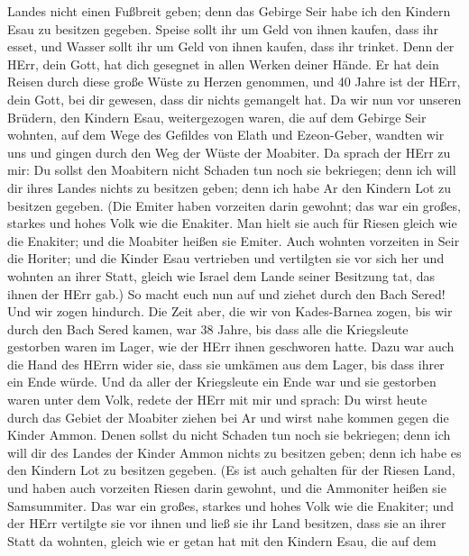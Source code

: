 Landes nicht einen Fußbreit geben; denn das Gebirge Seir habe ich den
Kindern Esau zu besitzen gegeben.  Speise sollt ihr um Geld
von ihnen kaufen, dass ihr esset, und Wasser sollt ihr um Geld von ihnen
kaufen, dass ihr trinket.  Denn der HErr, dein Gott, hat
dich gesegnet in allen Werken deiner Hände. Er hat dein Reisen durch
diese große Wüste zu Herzen genommen, und 40 Jahre ist der HErr, dein
Gott, bei dir gewesen, dass dir nichts gemangelt hat.  Da
wir nun vor unseren Brüdern, den Kindern Esau, weitergezogen waren, die
auf dem Gebirge Seir wohnten, auf dem Wege des Gefildes von Elath und
Ezeon-Geber, wandten wir uns und gingen durch den Weg der Wüste der
Moabiter.  Da sprach der HErr zu mir: Du sollst den
Moabitern nicht Schaden tun noch sie bekriegen; denn ich will dir ihres
Landes nichts zu besitzen geben; denn ich habe Ar den Kindern Lot zu
besitzen gegeben.  (Die Emiter haben vorzeiten darin
gewohnt; das war ein großes, starkes und hohes Volk wie die Enakiter.
 Man hielt sie auch für Riesen gleich wie die Enakiter; und
die Moabiter heißen sie Emiter.  Auch wohnten vorzeiten in
Seir die Horiter; und die Kinder Esau vertrieben und vertilgten sie vor
sich her und wohnten an ihrer Statt, gleich wie Israel dem Lande seiner
Besitzung tat, das ihnen der HErr gab.)  So macht euch nun
auf und ziehet durch den Bach Sered! Und wir zogen hindurch.
 Die Zeit aber, die wir von Kades-Barnea zogen, bis wir
durch den Bach Sered kamen, war 38 Jahre, bis dass alle die Kriegsleute
gestorben waren im Lager, wie der HErr ihnen geschworen hatte.
 Dazu war auch die Hand des HErrn wider sie, dass sie
umkämen aus dem Lager, bis dass ihrer ein Ende würde.  Und
da aller der Kriegsleute ein Ende war und sie gestorben waren unter dem
Volk,  redete der HErr mit mir und sprach:  Du
wirst heute durch das Gebiet der Moabiter ziehen bei Ar 
und wirst nahe kommen gegen die Kinder Ammon. Denen sollst du nicht
Schaden tun noch sie bekriegen; denn ich will dir des Landes der Kinder
Ammon nichts zu besitzen geben; denn ich habe es den Kindern Lot zu
besitzen gegeben.  (Es ist auch gehalten für der Riesen
Land, und haben auch vorzeiten Riesen darin gewohnt, und die Ammoniter
heißen sie Samsummiter.  Das war ein großes, starkes und
hohes Volk wie die Enakiter; und der HErr vertilgte sie vor ihnen und
ließ sie ihr Land besitzen, dass sie an ihrer Statt da wohnten,
 gleich wie er getan hat mit den Kindern Esau, die auf dem
